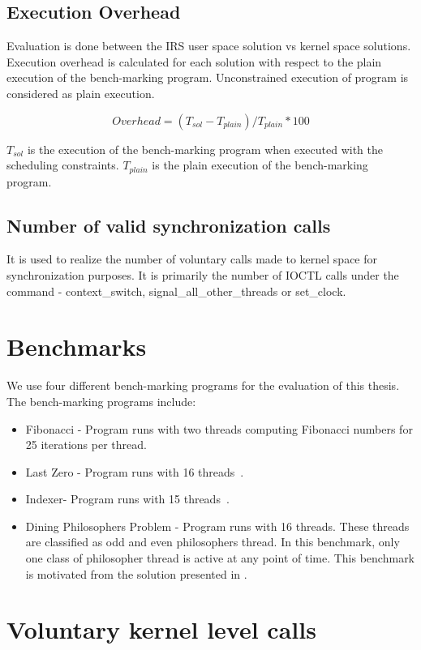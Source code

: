 \subsection{Execution Overhead}

Evaluation is done between the IRS user space solution vs kernel space solutions. 
Execution overhead is calculated for each solution with respect to the plain execution of the bench-marking program. 
Unconstrained execution of program is considered as plain execution. 

$$Overhead = (T_{sol} - T_{plain})/T_{plain} * 100$$

$T_{sol}$ is the execution of the bench-marking program when executed with the scheduling constraints. 
$T_{plain}$ is the plain execution of the bench-marking program. 

\subsection{Number of valid synchronization calls} 

It is used to realize the number of voluntary calls made to kernel space for synchronization purposes. 
It is primarily the number of IOCTL calls under the command - context\_switch, signal\_all\_other\_threads or set\_clock.


\section{Benchmarks}

We use four different bench-marking programs for the evaluation of this thesis. 
The bench-marking programs include:
\begin{itemize}
\item{Fibonacci} - Program runs with two threads computing Fibonacci numbers for 25 iterations per thread.
\item{Last Zero} - Program runs with 16 threads~\citep{abdulla2014optimal}.
\item{Indexer}- Program runs with 15 threads~\citep{dynamic_por}.
\item{Dining Philosophers Problem} - Program runs with 16 threads. These threads are classified as odd and even philosophers thread. 
In this benchmark, only one class of philosopher thread is active at any point of time. 
This benchmark is motivated from the solution presented in \citet{silberschatz2014operating}.
\end{itemize}

\section{Voluntary kernel level calls}

